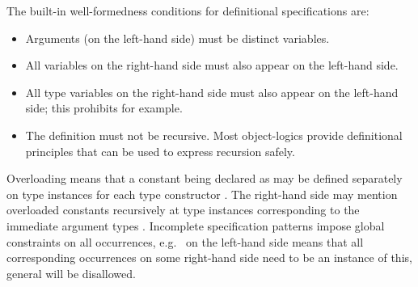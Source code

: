 \begin{isabellebody}
\begin{isamarkuptext}
  \medskip The built-in well-formedness conditions for definitional
  specifications are:

  \begin{itemize}

  \item Arguments (on the left-hand side) must be distinct variables.

  \item All variables on the right-hand side must also appear on the
  left-hand side.

  \item All type variables on the right-hand side must also appear on
  the left-hand side; this prohibits  for example.

  \item The definition must not be recursive.  Most object-logics
  provide definitional principles that can be used to express
  recursion safely.

  \end{itemize}

  Overloading means that a constant being declared as  may be defined separately on type instances  for each type constructor .  The right-hand side may mention overloaded constants
  recursively at type instances corresponding to the immediate
  argument types .  Incomplete
  specification patterns impose global constraints on all occurrences,
  e.g.\  on the left-hand side means that all
  corresponding occurrences on some right-hand side need to be an
  instance of this, general  will be disallowed.


\end{isamarkuptext}
\end{isabellebody}
